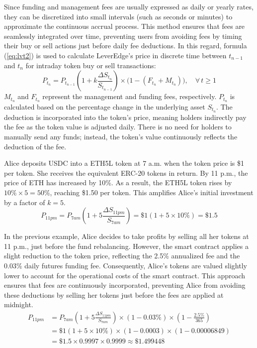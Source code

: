 Since funding and management fees are usually expressed as daily or yearly rates, they can be discretized into small intervals (such as seconds or minutes) to approximate the continuous accrual process. This method ensures that fees are seamlessly integrated over time, preventing users from avoiding fees by timing their buy or sell actions just before daily fee deductions. In this regard,  formula (\ref{eq:lvt2}) is used to calculate LeverEdge's price in discrete time between \( t_{n-1} \) and \( t_n \) for intraday token buy or sell transactions:
\begin{equation}\label{eq:lvt2}
	P_{t_n} = P_{t_{n-1}}\left(1+k\frac{\Delta S_{t_{n}}}{S_{t_{n-1}}}\right) \times \big(1 - (F_{t_n} + M_{t_n}) \big), \quad \forall \, t \ge 1
\end{equation}
\(M_{t_n}\) and \(F_{t_n}\) represent the management and funding fees, respectively. \(P_{t_n}\) is calculated based on the percentage change in the underlying asset \(S_{t_{n}}\). The deduction is incorporated into the token's price, meaning holders indirectly pay the fee as the token value is adjusted daily. There is no need for holders to manually send any funds; instead, the token’s value continuously reflects the deduction of the fee.

\begin{example}
	Alice deposits USDC into a ETH5L token at 7 a.m. when the token price is \$1 per token. She receives the equivalent ERC-20 tokens in return. By 11 p.m., the price of ETH has increased by 10\%. As a result, the ETH5L token rises by \(10\% \times 5 = 50\%\), reaching \$1.50 per token. This amplifies Alice's initial investment by a factor of \(k=5\).
	\begin{equation*}
		P_{11pm} = P_{7am}\left(1+5\frac{\Delta S_{11pm}}{S_{7am}}\right) = \$1 (1+5 \times 10\%) = \$1.5
	\end{equation*}
\end{example}

\begin{example}
	In the previous example, Alice decides to take profits by selling all her tokens at 11 p.m., just before the fund rebalancing. However, the smart contract applies a slight reduction to the token price, reflecting the 2.5\% annualized fee and the 0.03\% daily futures funding fee. Consequently, Alice's tokens are valued slightly lower to account for the operational costs of the smart contract. This approach ensures that fees are continuously incorporated, preventing Alice from avoiding these deductions by selling her tokens just before the fees are applied at midnight.
	\begin{equation*}
		\begin{aligned}
			P_{11pm} &= P_{7am}\left(1+5\frac{\Delta S_{11pm}}{S_{7am}}\right) \times (1-0.03\%) \times \left(1-\frac{2.5\%}{365}\right)\\
			&= \$1 (1+5 \times 10\%) \times (1-0.0003) \times (1-0.00006849)\\
			&= \$1.5 \times 0.9997 \times 0.9999 \approx \$1.499448
		\end{aligned}
	\end{equation*}
\end{example}

